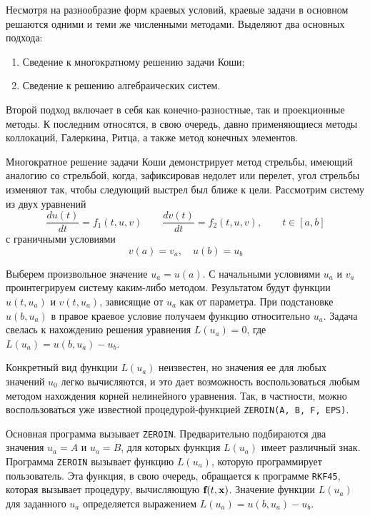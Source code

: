 Несмотря на разнообразие форм краевых условий, краевые задачи в основном решаются одними и теми же численными методами.
Выделяют два основных подхода:
\begin{enumerate}
    \item Сведение к многократному решению задачи Коши;
    \item Сведение к решению алгебраических систем.
\end{enumerate}
Второй подход включает в себя как конечно-разностные, так и проекционные методы. К последним относятся, в свою очередь,
давно применяющиеся методы коллокаций, Галеркина, Ритца, а также метод конечных элементов.
\vspace{10pt}

Многократное решение задачи Коши демонстрирует метод стрельбы, имеющий аналогию со стрельбой, когда, зафиксировав
недолет или перелет, угол стрельбы изменяют так, чтобы следующий выстрел был ближе к цели. Рассмотрим систему из
двух уравнений
\begin{equation*}
    \frac{du(t)}{dt} = f_1(t, u, v) \qquad \frac{dv(t)}{dt} = f_2(t, u, v), \qquad t \in [a, b]
\end{equation*}
с граничными условиями
\begin{equation*}
    v(a) = v_a, \quad u(b) = u_b
\end{equation*}

Выберем произвольное значение $\displaystyle u_a = u(a)$. С начальными условиями $\displaystyle u_a \text{ и } v_a$
проинтегрируем систему каким-либо методом. Результатом будут функции $\displaystyle u(t, u_a) \text{ и } v(t, u_a)$,
зависящие от $\displaystyle u_a$ как от параметра. При подстановке $\displaystyle u(b, u_a)$ в правое краевое условие
получаем функцию относительно $\displaystyle u_a$. Задача свелась к нахождению решения уравнения $\displaystyle L(u_a) = 0$,
где $\displaystyle L(u_a) = u(b, u_a) - u_b$.

Конкретный вид функции $\displaystyle L(u_a)$ неизвестен, но значения ее для любых значений $\displaystyle u_0$
легко вычисляются, и это дает возможность воспользоваться любым методом нахождения корней нелинейного уравнения. Так,
в частности, можно воспользоваться уже известной процедурой-функцией \verb|ZEROIN(A, B, F, EPS)|.
\vspace{5pt}

Основная программа вызывает \verb|ZEROIN|. Предварительно подбираются два значения $\displaystyle u_a = A$ и
$\displaystyle u_a = B$, для которых функция $\displaystyle L(u_a)$ имеет различный знак. Программа \verb|ZEROIN|
вызывает функцию $\displaystyle L(u_a)$, которую программирует пользователь. Эта функция, в свою очередь, обращается
к программе \verb|RKF45|, которая вызывает процедуру, вычисляющую $\bf{f}(t, \bf{x})$. Значение функции
$\displaystyle L(u_a)$ для заданного $\displaystyle u_a$ определяется выражением $\displaystyle L(u_a) = u(b, u_a) - u_b$.

